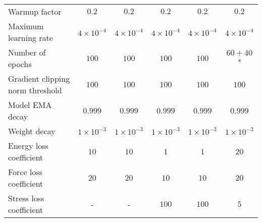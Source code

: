 \documentclass[twocolumn]{fairmeta}
\begin{document}
\begin{table*}[h]
\begin{adjustbox}{width=0.9\linewidth}
\begin{tabular}{l|ccccc}
Warmup factor & $0.2$ & $0.2$ & $0.2$ & $0.2$ & $0.2$  \\
Maximum learning rate & $4 \times 10 ^{-4}$ & $4 \times 10^{-4}$ & $4 \times 10 ^{-4}$ & $4 \times 10^{-4}$ & $4 \times 10 ^{-4}$ \\
Number of epochs & $100$ & $100$ & $100$ & $100$ & $60 + 40$\textsuperscript{*} \\
Gradient clipping norm threshold & $100$ & $100$ & $100$ & $100$ & $100$ \\
Model EMA decay & $0.999$ & $0.999$ & $0.999$ & $0.999$& $0.999$ \\
Weight decay & $1 \times 10 ^{-3}$ & $1 \times 10 ^{-3}$ & $1 \times 10 ^{-3}$ & $1 \times 10 ^{-3}$ & $1 \times 10 ^{-3}$ \\
Energy loss coefficient & $10$ & $10$ & $1$ & $1$ & $20$ \\
Force loss coefficient & $20$ & $20$ & $10$ & $10$ & $20$\\
Stress loss coefficient & - & - & $100$ & $100$ & $5$ \\
\bottomrule
\end{tabular}
\end{adjustbox}
\end{table*}
\end{document}
